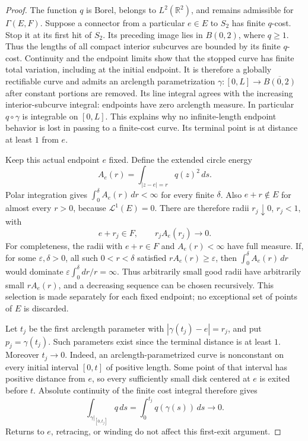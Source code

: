 \documentclass[11pt]{article}
\newcommand{\R}{\mathbb R}
\newcommand{\length}{\mathcal L^1}
\begin{document}
\begin{proof}
The function $q$ is Borel, belongs to $L^2(\R^2)$, and remains admissible
for $\Gamma(E,F)$. Suppose a connector from a particular $e\in E$ to
$S_2$ has finite $q$-cost. Stop it at its first hit of $S_2$. Its preceding
image lies in $B(0,2)$, where $q\geq1$. Thus the lengths of all compact
interior subcurves are bounded by its finite $q$-cost. Continuity and the
endpoint limits show that the stopped curve has finite total variation,
including at the initial endpoint. It is therefore a globally rectifiable
curve and admits an arclength parametrization
$\gamma:[0,L]\to\overline{B(0,2)}$ after constant portions are removed.
Its line integral agrees with the increasing interior-subcurve integral:
endpoints have zero arclength measure. In particular $q\circ\gamma$ is
integrable on $[0,L]$. This explains why no infinite-length endpoint
behavior is lost in passing to a finite-cost curve. Its terminal point is
at distance at least $1$ from $e$.

Keep this actual endpoint $e$ fixed. Define the extended circle energy
\[
 A_e(r)=\int_{|z-e|=r}q(z)^2\,ds.
\]
Polar integration gives $\int_0^\delta A_e(r)\,dr<\infty$ for every finite
$\delta$. Also $e+r\notin E$ for almost every $r>0$, because
$\length(E)=0$. There are therefore radii $r_j\downarrow0$, $r_j<1$,
with
\begin{equation}\label{eq:radii}
 e+r_j\in F,\qquad r_jA_e(r_j)\longrightarrow0.
\end{equation}
For completeness, the radii with $e+r\in F$ and $A_e(r)<\infty$ have full
measure. If, for some $\varepsilon,\delta>0$, all such $0<r<\delta$
satisfied $rA_e(r)\geq\varepsilon$, then $\int_0^\delta A_e(r)\,dr$
would dominate $\varepsilon\int_0^\delta dr/r=\infty$. Thus arbitrarily
small good radii have arbitrarily small $rA_e(r)$, and a decreasing sequence
can be chosen recursively. This selection is made separately for each
fixed endpoint; no exceptional set of points of $E$ is discarded.

Let $t_j$ be the first arclength parameter with
$|\gamma(t_j)-e|=r_j$, and put $p_j=\gamma(t_j)$. Such parameters exist
since the terminal distance is at least $1$. Moreover $t_j\to0$.
Indeed, an arclength-parametrized curve is nonconstant on every initial
interval $[0,t]$ of positive length. Some point of that interval has
positive distance from $e$, so every sufficiently small disk centered at
$e$ is exited before $t$. Absolute continuity of the finite cost integral
therefore gives
\begin{equation}\label{eq:initialcost}
 \int_{\gamma|_{[0,t_j]}}q\,ds
 =\int_0^{t_j}q(\gamma(s))\,ds\longrightarrow0.
\end{equation}
Returns to $e$, retracing, or winding do not affect this first-exit argument.


\end{proof}
\end{document}
